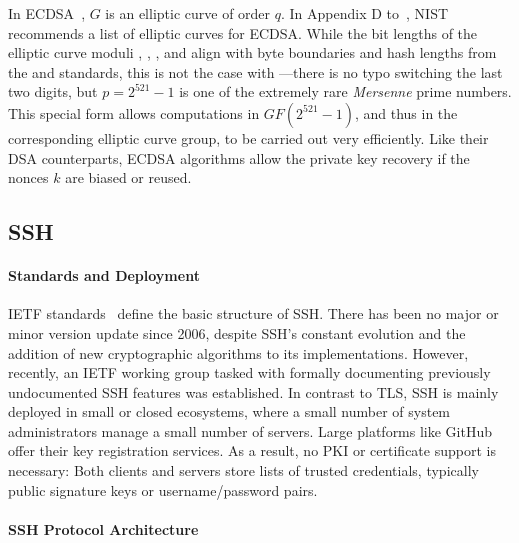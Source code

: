 In ECDSA~\cite{FIPS-186-4}, $G$ is an elliptic curve of order $q$. In Appendix D to~\cite{FIPS-186-4}, NIST recommends a list of elliptic curves for ECDSA. While the bit lengths of the elliptic curve moduli \poneninetwo, \ptwotwofour, \ptwofivesix, and \pthreeeightfour align with byte boundaries and hash lengths from the \shatwo and \shathree standards, this is not the case with \pfivetwoone---there is no typo switching the last two digits, but $p=2^{521}-1$ is one of the extremely rare \emph{Mersenne} prime numbers. This special form allows computations in $GF(2^{521}-1)$, and thus in the corresponding elliptic curve group, to be carried out very efficiently. Like their DSA counterparts, ECDSA algorithms allow the private key recovery if the nonces $k$ are biased or reused.

\subsection{SSH}
\label{subsec:ssh}

\paragraph{Standards and Deployment}

IETF standards~\cite{rfc4252,rfc4253,rfc4254} define the basic structure of SSH. There has been no major or minor version update since 2006, despite SSH's constant evolution and the addition of new cryptographic algorithms to its implementations. However, recently, an IETF working group tasked with formally documenting previously undocumented SSH features was established. In contrast to TLS, SSH is mainly deployed in small or closed ecosystems, where a small number of system administrators manage a small number of servers. Large platforms like GitHub offer their key registration services. As a result, no PKI or certificate support is necessary: Both clients and servers store lists of trusted credentials, typically public signature keys or username/password pairs.


\paragraph{SSH Protocol Architecture}

